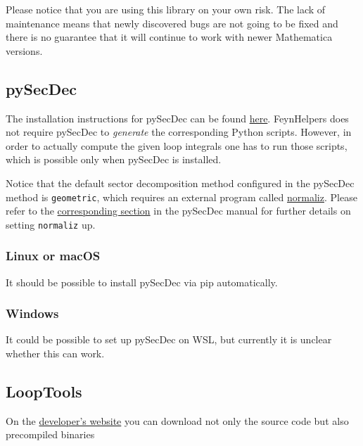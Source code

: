 \documentclass[../FeynHelpersManual.tex]{subfiles}
\begin{document}
Please notice that you are using this library on your own risk. The lack
of maintenance means that newly discovered bugs are not going to be
fixed and there is no guarantee that it will continue to work with newer
Mathematica versions.

\hypertarget{pysecdec}{%
\subsection{pySecDec}\label{pysecdec}}

The installation instructions for pySecDec can be found
\href{https://secdec.readthedocs.io/en/stable/installation.html\#download-the-program-and-install}{here}.
FeynHelpers does not require pySecDec to \emph{generate} the
corresponding Python scripts. However, in order to actually compute the
given loop integrals one has to run those scripts, which is possible
only when pySecDec is installed.

Notice that the default sector decomposition method configured in the
pySecDec method is \texttt{geometric}, which requires an external
program called \href{https://www.normaliz.uni-osnabrueck.de}{normaliz}.
Please refer to the
\href{https://secdec.readthedocs.io/en/stable/installation.html?highlight=normaliz\#the-geomethod-and-normaliz}{corresponding
section} in the pySecDec manual for further details on setting
\texttt{normaliz} up.

\hypertarget{linux-or-macos}{%
\subsubsection{Linux or macOS}\label{linux-or-macos}}

It should be possible to install pySecDec via pip automatically.

\hypertarget{windows-3}{%
\subsubsection{Windows}\label{windows-3}}

It could be possible to set up pySecDec on WSL, but currently it is
unclear whether this can work.

\hypertarget{looptools}{%
\subsection{LoopTools}\label{looptools}}

On the \href{http://www.feynarts.de/looptools/}{developer's website} you
can download not only the source code but also precompiled binaries
\end{document}

